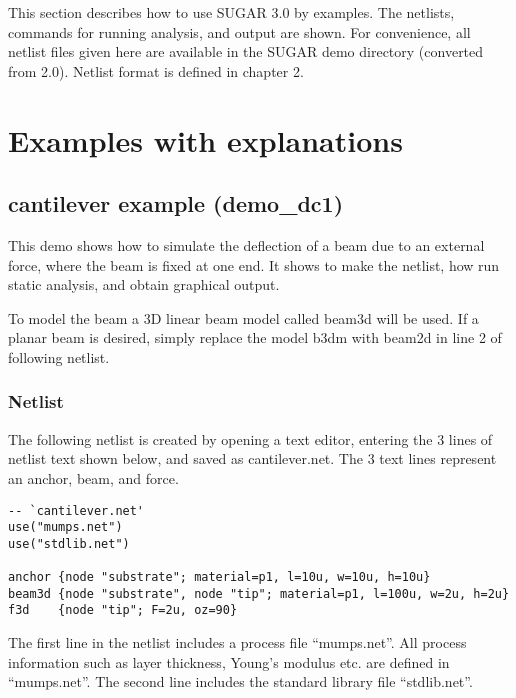 

 
This section describes how to use SUGAR 3.0 by examples. The netlists, commands
for running analysis, and output are shown. For convenience, all netlist files
given here are available in the SUGAR demo directory (converted from 2.0). Netlist 
format is defined in chapter 2.  

\section{Examples with explanations}

\subsection{cantilever example (demo\_dc1)}

This  demo  shows  how  to  simulate  the  deflection  of  a  beam  due  to  an
external  force, where the beam is fixed at one end. It shows to make the
netlist, how run static analysis, and obtain graphical output. 

To model the beam a 3D linear beam model called beam3d will be used. If a
planar beam is desired, simply replace the model b3dm with beam2d in line 2 of
following netlist. 

\subsubsection*{Netlist}

The following netlist is created by opening a text editor, entering the 3 lines
of netlist text shown below, and saved as cantilever.net. The 3 text lines
represent an anchor, beam, and force.  
\begin{verbatim}
-- `cantilever.net' 
use("mumps.net")
use("stdlib.net")

anchor {node "substrate"; material=p1, l=10u, w=10u, h=10u}
beam3d {node "substrate", node "tip"; material=p1, l=100u, w=2u, h=2u}
f3d    {node "tip"; F=2u, oz=90}
\end{verbatim}

The first line in the netlist includes a process file ``mumps.net''. All process
information such as layer thickness, Young's modulus etc. are defined in
``mumps.net''.   The second line includes the standard library file
``stdlib.net''.


